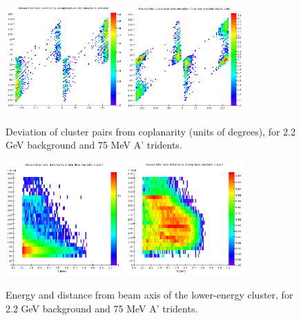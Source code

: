 \begin{figure}[ht]
	\includegraphics[width=0.4\textwidth]{performance/coplanarity_22}
	\includegraphics[width=0.4\textwidth]{performance/coplanarity_22_075mev}
	\caption{\small{Deviation of cluster pairs from coplanarity (units of degrees), for 2.2 GeV background and 75 MeV A' tridents.}}
	\label{fig:coplanarity}
\end{figure}

\begin{figure}[ht]
	\includegraphics[width=0.4\textwidth]{performance/energy-distance_22}
	\includegraphics[width=0.4\textwidth]{performance/energy-distance_22_075mev}
	\caption{\small{Energy and distance from beam axis of the lower-energy cluster, for 2.2 GeV background and 75 MeV A' tridents.}}
	\label{fig:energy-distance}
\end{figure}

